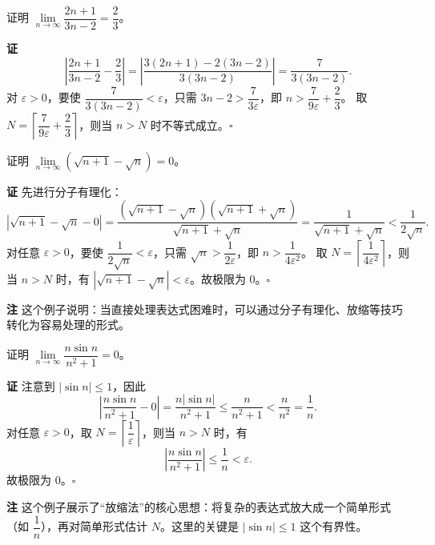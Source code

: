 \documentclass[fontset=fandol]{ctexart}
\newenvironment{custom}[1]{\par\noindent\textbf{#1}\quad}{\par\vspace{0.8em}}
\newenvironment{remark}{\par\noindent\textbf{注}\quad}{\par\vspace{0.8em}}
\begin{document}
\begin{example}
证明 \(\lim\limits_{n\to\infty} \dfrac{2n+1}{3n-2} = \dfrac{2}{3}\)。
\end{example}
\begin{custom}{证}
\[
\left|\dfrac{2n+1}{3n-2} - \dfrac{2}{3}\right| = \left|\dfrac{3(2n+1)-2(3n-2)}{3(3n-2)}\right| = \dfrac{7}{3(3n-2)}.
\]
对 \(\varepsilon > 0\)，要使 \(\dfrac{7}{3(3n-2)} < \varepsilon\)，只需 \(3n-2 > \dfrac{7}{3\varepsilon}\)，即 \(n > \dfrac{7}{9\varepsilon} + \dfrac{2}{3}\)。
取 \(N = \left\lceil \dfrac{7}{9\varepsilon} + \dfrac{2}{3} \right\rceil\)，则当 \(n > N\) 时不等式成立。\(\square\)
\end{custom}

\begin{example}
证明 \(\lim\limits_{n\to\infty} \left(\sqrt{n+1} - \sqrt{n}\right) = 0\)。
\end{example}
\begin{custom}{证}
先进行分子有理化：
\[
\left|\sqrt{n+1} - \sqrt{n} - 0\right| = \dfrac{(\sqrt{n+1} - \sqrt{n})(\sqrt{n+1} + \sqrt{n})}{\sqrt{n+1} + \sqrt{n}} = \dfrac{1}{\sqrt{n+1} + \sqrt{n}} < \dfrac{1}{2\sqrt{n}}.
\]
对任意 \(\varepsilon > 0\)，要使 \(\dfrac{1}{2\sqrt{n}} < \varepsilon\)，只需 \(\sqrt{n} > \dfrac{1}{2\varepsilon}\)，即 \(n > \dfrac{1}{4\varepsilon^2}\)。
取 \(N = \left\lceil \dfrac{1}{4\varepsilon^2} \right\rceil\)，则当 \(n > N\) 时，有 \(\left|\sqrt{n+1} - \sqrt{n}\right| < \varepsilon\)。故极限为 0。\(\square\)
\end{custom}

\begin{remark}
这个例子说明：当直接处理表达式困难时，可以通过分子有理化、放缩等技巧转化为容易处理的形式。
\end{remark}

\begin{example}
证明 \(\lim\limits_{n\to\infty} \dfrac{n \sin n}{n^2 + 1} = 0\)。
\end{example}
\begin{custom}{证}
注意到 \(|\sin n| \leq 1\)，因此
\[
\left|\dfrac{n \sin n}{n^2 + 1} - 0\right| = \dfrac{n |\sin n|}{n^2 + 1} \leq \dfrac{n}{n^2 + 1} < \dfrac{n}{n^2} = \dfrac{1}{n}.
\]
对任意 \(\varepsilon > 0\)，取 \(N = \left\lceil \dfrac{1}{\varepsilon} \right\rceil\)，则当 \(n > N\) 时，有
\[
\left|\dfrac{n \sin n}{n^2 + 1}\right| \leq \dfrac{1}{n} < \varepsilon.
\]
故极限为 0。\(\square\)
\end{custom}

\begin{remark}
这个例子展示了“放缩法”的核心思想：将复杂的表达式放大成一个简单形式（如 \(\dfrac{1}{n}\)），再对简单形式估计 \(N\)。这里的关键是 \(|\sin n| \leq 1\) 这个有界性。
\end{remark}
\end{document}
